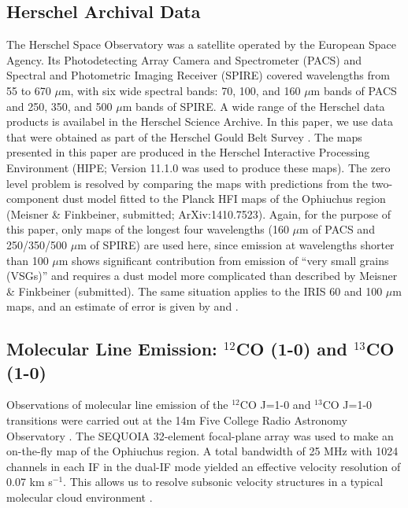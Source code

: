 \documentclass[11pt,a4paper]{emulateapj}
\begin{document}
\subsection{Herschel Archival Data}
The Herschel Space Observatory was a satellite operated by the European Space Agency. Its Photodetecting Array Camera and Spectrometer (PACS) and Spectral and Photometric Imaging Receiver (SPIRE) covered wavelengths from 55 to 670 $\mu$m, with six wide spectral bands: 70, 100, and 160 $\mu$m bands of PACS and 250, 350, and 500 $\mu$m bands of SPIRE. A wide range of the Herschel data products is availabel in the Herschel Science Archive. In this paper, we use data that were obtained as part of the Herschel Gould Belt Survey \citep{Andr__2010}. The maps presented in this paper are produced in the Herschel Interactive Processing Environment (HIPE; Version 11.1.0 was used to produce these maps). The zero level problem is resolved by comparing the maps with predictions from the two-component dust model fitted to the Planck HFI maps of the Ophiuchus region (Meisner \& Finkbeiner, submitted; ArXiv:1410.7523). Again, for the purpose of this paper, only maps of the longest four wavelengths (160 $\mu$m of PACS and 250/350/500 $\mu$m of SPIRE) are used here, since emission at wavelengths shorter than 100 $\mu$m shows significant contribution from emission of ``very small grains (VSGs)'' and requires a dust model more complicated than described by Meisner \& Finkbeiner (submitted). The same situation applies to the IRIS 60 and 100 $\mu$m maps, and an estimate of error is given by \citet{Schnee_2006} and \citet{Schnee_2007}.

\subsection{Molecular Line Emission: $^{12}$CO (1-0) and $^{13}$CO (1-0)}
Observations of molecular line emission of the $^{12}$CO J=1-0 and $^{13}$CO J=1-0 transitions were carried out at the 14m Five College Radio Astronomy Observatory \citep[FCRAO;]{Ridge_2006}. The SEQUOIA 32-element focal-plane array was used to make an on-the-fly map of the Ophiuchus region. A total bandwidth of 25 MHz with 1024 channels in each IF in the dual-IF mode yielded an effective velocity resolution of 0.07 km s$^{-1}$. This allows us to resolve subsonic velocity structures in a typical molecular cloud environment \citep[with a temperature of 15 K and an average molecular weight of 2.33 m$_H$;]{Carey_1998,Pillai_2006}.
\end{document}
